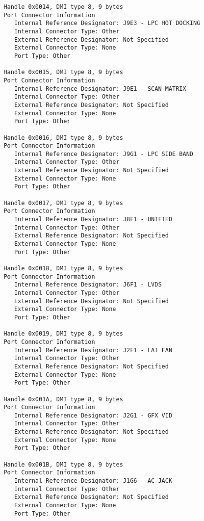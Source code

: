 \documentclass[11pt]{article}
\begin{document}
\begin{tiny}
\begin{verbatim}
         Handle 0x0014, DMI type 8, 9 bytes
         Port Connector Information
            Internal Reference Designator: J9E3 - LPC HOT DOCKING
            Internal Connector Type: Other
            External Reference Designator: Not Specified
            External Connector Type: None
            Port Type: Other
         
         Handle 0x0015, DMI type 8, 9 bytes
         Port Connector Information
            Internal Reference Designator: J9E1 - SCAN MATRIX
            Internal Connector Type: Other
            External Reference Designator: Not Specified
            External Connector Type: None
            Port Type: Other
         
         Handle 0x0016, DMI type 8, 9 bytes
         Port Connector Information
            Internal Reference Designator: J9G1 - LPC SIDE BAND
            Internal Connector Type: Other
            External Reference Designator: Not Specified
            External Connector Type: None
            Port Type: Other
         
         Handle 0x0017, DMI type 8, 9 bytes
         Port Connector Information
            Internal Reference Designator: J8F1 - UNIFIED
            Internal Connector Type: Other
            External Reference Designator: Not Specified
            External Connector Type: None
            Port Type: Other
         
         Handle 0x0018, DMI type 8, 9 bytes
         Port Connector Information
            Internal Reference Designator: J6F1 - LVDS
            Internal Connector Type: Other
            External Reference Designator: Not Specified
            External Connector Type: None
            Port Type: Other
         
         Handle 0x0019, DMI type 8, 9 bytes
         Port Connector Information
            Internal Reference Designator: J2F1 - LAI FAN
            Internal Connector Type: Other
            External Reference Designator: Not Specified
            External Connector Type: None
            Port Type: Other
         
         Handle 0x001A, DMI type 8, 9 bytes
         Port Connector Information
            Internal Reference Designator: J2G1 - GFX VID
            Internal Connector Type: Other
            External Reference Designator: Not Specified
            External Connector Type: None
            Port Type: Other
         
         Handle 0x001B, DMI type 8, 9 bytes
         Port Connector Information
            Internal Reference Designator: J1G6 - AC JACK
            Internal Connector Type: Other
            External Reference Designator: Not Specified
            External Connector Type: None
            Port Type: Other
         

\end{verbatim}
\end{tiny}
\end{document}
